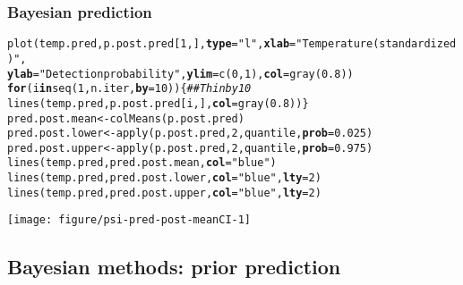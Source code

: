 \documentclass[color=usenames,dvipsnames]{beamer}\usepackage[]{graphicx}\usepackage[]{color}
\makeatletter
\newcommand{\hlnum}[1]{\textcolor[rgb]{0.69,0.494,0}{#1}}%
\newcommand{\hlstr}[1]{\textcolor[rgb]{0.749,0.012,0.012}{#1}}%
\newcommand{\hlcom}[1]{\textcolor[rgb]{0.514,0.506,0.514}{\textit{#1}}}%
\newcommand{\hlstd}[1]{\textcolor[rgb]{0,0,0}{#1}}%
\newcommand{\hlkwa}[1]{\textcolor[rgb]{0,0,0}{\textbf{#1}}}%
\newcommand{\hlkwb}[1]{\textcolor[rgb]{0,0.341,0.682}{#1}}%
\newcommand{\hlkwc}[1]{\textcolor[rgb]{0,0,0}{\textbf{#1}}}%
\newcommand{\hlkwd}[1]{\textcolor[rgb]{0.004,0.004,0.506}{#1}}%
\newenvironment{kframe}{%
 \def\at@end@of@kframe{}%
 \ifinner\ifhmode%
  \def\at@end@of@kframe{\end{minipage}}%
  \begin{minipage}{\columnwidth}%
 \fi\fi%
 \def\FrameCommand##1{\hskip\@totalleftmargin \hskip-\fboxsep
 \colorbox{shadecolor}{##1}\hskip-\fboxsep
     \hskip-\linewidth \hskip-\@totalleftmargin \hskip\columnwidth}%
 \MakeFramed {\advance\hsize-\width
   \@totalleftmargin\z@ \linewidth\hsize
   \@setminipage}}%
 {\par\unskip\endMakeFramed%
 \at@end@of@kframe}
\newenvironment{knitrout}{}{} %
\makeatother
\begin{document}
\begin{frame}[fragile]
  \frametitle{Bayesian prediction}
\begin{knitrout}\tiny
{}\color{fgcolor}\begin{kframe}
\begin{alltt}
\hlkwd{plot}\hlstd{(temp.pred, p.post.pred[}\hlnum{1}\hlstd{,],} \hlkwc{type}\hlstd{=}\hlstr{"l"}\hlstd{,} \hlkwc{xlab}\hlstd{=}\hlstr{"Temperature (standardized)"}\hlstd{,}
     \hlkwc{ylab}\hlstd{=}\hlstr{"Detection probability"}\hlstd{,} \hlkwc{ylim}\hlstd{=}\hlkwd{c}\hlstd{(}\hlnum{0}\hlstd{,} \hlnum{1}\hlstd{),} \hlkwc{col}\hlstd{=}\hlkwd{gray}\hlstd{(}\hlnum{0.8}\hlstd{))}
\hlkwa{for}\hlstd{(i} \hlkwa{in} \hlkwd{seq}\hlstd{(}\hlnum{1}\hlstd{, n.iter,} \hlkwc{by}\hlstd{=}\hlnum{10}\hlstd{)) \{}  \hlcom{## Thin by 10}
    \hlkwd{lines}\hlstd{(temp.pred, p.post.pred[i,],} \hlkwc{col}\hlstd{=}\hlkwd{gray}\hlstd{(}\hlnum{0.8}\hlstd{))  \}}
\hlstd{pred.post.mean} \hlkwb{<-} \hlkwd{colMeans}\hlstd{(p.post.pred)}
\hlstd{pred.post.lower} \hlkwb{<-} \hlkwd{apply}\hlstd{(p.post.pred,} \hlnum{2}\hlstd{, quantile,} \hlkwc{prob}\hlstd{=}\hlnum{0.025}\hlstd{)}
\hlstd{pred.post.upper} \hlkwb{<-} \hlkwd{apply}\hlstd{(p.post.pred,} \hlnum{2}\hlstd{, quantile,} \hlkwc{prob}\hlstd{=}\hlnum{0.975}\hlstd{)}
\hlkwd{lines}\hlstd{(temp.pred, pred.post.mean,} \hlkwc{col}\hlstd{=}\hlstr{"blue"}\hlstd{)}
\hlkwd{lines}\hlstd{(temp.pred, pred.post.lower,} \hlkwc{col}\hlstd{=}\hlstr{"blue"}\hlstd{,} \hlkwc{lty}\hlstd{=}\hlnum{2}\hlstd{)}
\hlkwd{lines}\hlstd{(temp.pred, pred.post.upper,} \hlkwc{col}\hlstd{=}\hlstr{"blue"}\hlstd{,} \hlkwc{lty}\hlstd{=}\hlnum{2}\hlstd{)}
\end{alltt}
\end{kframe}

{\centering \texttt{[image: figure/psi-pred-post-meanCI-1]} 

}



\end{knitrout}
\end{frame}





\subsection{Bayesian methods: prior prediction}
\end{document}
